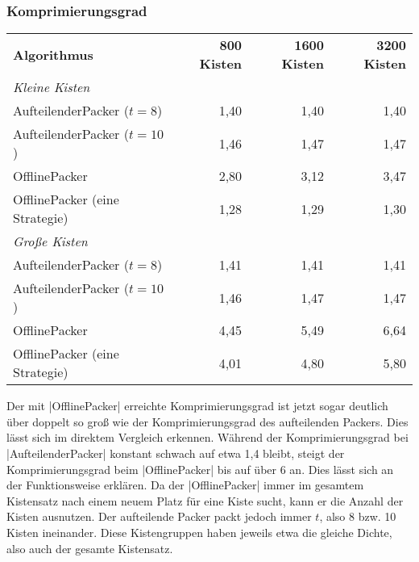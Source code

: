 \subsubsection*{Komprimierungsgrad}
\begin{center}
\begin{tabular}{lrrr}
\vspace*{.42em}
\textbf{Algorithmus} 	& \textbf{800 Kisten} 	& \textbf{1600 Kisten} 	& \textbf{3200 Kisten} \\
\textit{Kleine Kisten} & & & \\
 AufteilenderPacker ($t=8$)  	& 1,40		& 1,40			& 1,40			\\
 AufteilenderPacker ($t=10$)  	& 1,46		& 1,47			& 1,47			\\
 OfflinePacker			& 2,80		& 3,12			& 3,47			\\
 \vspace{.42em}
 OfflinePacker (eine Strategie)	& 1,28		& 1,29			& 1,30			\\
\textit{Große Kisten} & & & \\
 AufteilenderPacker ($t=8$)  	& 1,41		& 1,41			& 1,41			\\
 AufteilenderPacker ($t=10$)  	& 1,46		& 1,47			& 1,47			\\
 OfflinePacker			& 4,45		& 5,49			& 6,64			\\
 OfflinePacker (eine Strategie)	& 4,01		& 4,80			& 5,80			\\
\end{tabular}
\end{center}
 Der mit |OfflinePacker| erreichte Komprimierungsgrad ist jetzt sogar deutlich über doppelt so groß wie der Komprimierungsgrad des aufteilenden Packers.
 Dies lässt sich im direktem Vergleich erkennen.
 Während der Komprimierungsgrad bei |AufteilenderPacker| konstant schwach auf etwa 1,4 bleibt,
  steigt der Komprimierungsgrad beim |OfflinePacker| bis auf über 6 an.
 Dies lässt sich an der Funktionsweise erklären.
 Da der |OfflinePacker| immer im gesamtem Kistensatz nach einem neuem Platz für eine Kiste sucht, kann er die Anzahl der Kisten ausnutzen.
 Der aufteilende Packer packt jedoch immer $t$, also 8 bzw. 10 Kisten ineinander.
 Diese Kistengruppen haben jeweils etwa die gleiche Dichte, also auch der gesamte Kistensatz.

